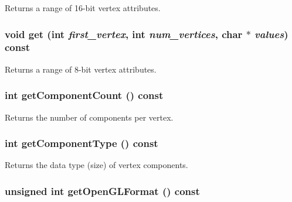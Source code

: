 Returns a range of 16-bit vertex attributes. \hypertarget{classm3g_1_1VertexArray_9d1b801a7c196a07553a5ef4a5473573}{
\subsubsection[{get}]{\setlength{\rightskip}{0pt plus 5cm}void get (int {\em first\_\-vertex}, \/  int {\em num\_\-vertices}, \/  char $\ast$ {\em values}) const}}
\label{classm3g_1_1VertexArray_9d1b801a7c196a07553a5ef4a5473573}


Returns a range of 8-bit vertex attributes. \hypertarget{classm3g_1_1VertexArray_7016f51d2788e78fdd736efd040f5e5e}{
\subsubsection[{getComponentCount}]{\setlength{\rightskip}{0pt plus 5cm}int getComponentCount () const}}
\label{classm3g_1_1VertexArray_7016f51d2788e78fdd736efd040f5e5e}


Returns the number of components per vertex. \hypertarget{classm3g_1_1VertexArray_9b7b78fbff0603779ec6bdd2a323c939}{
\subsubsection[{getComponentType}]{\setlength{\rightskip}{0pt plus 5cm}int getComponentType () const}}
\label{classm3g_1_1VertexArray_9b7b78fbff0603779ec6bdd2a323c939}


Returns the data type (size) of vertex components. \hypertarget{classm3g_1_1VertexArray_3e28ae5596cde78a980de02005a136f2}{
\subsubsection[{getOpenGLFormat}]{\setlength{\rightskip}{0pt plus 5cm}unsigned int getOpenGLFormat () const}}
\label{classm3g_1_1VertexArray_3e28ae5596cde78a980de02005a136f2}


